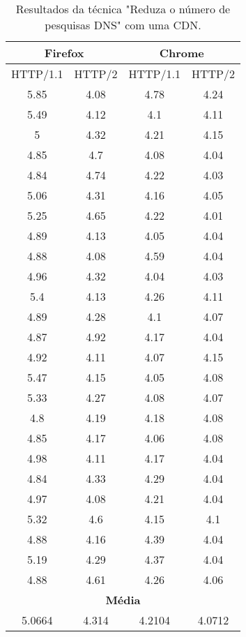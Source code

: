 \begin{table}[H]
	\centering
	\caption{Resultados da técnica "Reduza o número de pesquisas DNS" com uma CDN.}
	\label{resultados-reduzaonumerodepesquisasdns-unica}
	\begin{tabular}{cccc}
		\hline
		\multicolumn{2}{c}{\textbf{Firefox}} & \multicolumn{2}{c}{\textbf{Chrome}} \\
		\hline
		HTTP/1.1 & HTTP/2 & HTTP/1.1 & HTTP/2 \\
		\hline
		5.85 & 4.08 & 4.78 & 4.24 \\
		5.49 & 4.12 & 4.1 & 4.11 \\
		5 & 4.32 & 4.21 & 4.15 \\
		4.85 & 4.7 & 4.08 & 4.04 \\
		4.84 & 4.74 & 4.22 & 4.03 \\
		5.06 & 4.31 & 4.16 & 4.05 \\
		5.25 & 4.65 & 4.22 & 4.01 \\
		4.89 & 4.13 & 4.05 & 4.04 \\
		4.88 & 4.08 & 4.59 & 4.04 \\
		4.96 & 4.32 & 4.04 & 4.03 \\
		5.4 & 4.13 & 4.26 & 4.11 \\
		4.89 & 4.28 & 4.1 & 4.07 \\
		4.87 & 4.92 & 4.17 & 4.04 \\
		4.92 & 4.11 & 4.07 & 4.15 \\
		5.47 & 4.15 & 4.05 & 4.08 \\
		5.33 & 4.27 & 4.08 & 4.07 \\
		4.8 & 4.19 & 4.18 & 4.08 \\ 
		4.85 & 4.17 & 4.06 & 4.08 \\
		4.98 & 4.11 & 4.17 & 4.04 \\
		4.84 & 4.33 & 4.29 & 4.04 \\
		4.97 & 4.08 & 4.21 & 4.04 \\
		5.32 & 4.6 & 4.15 & 4.1 \\
		4.88 & 4.16 & 4.39 & 4.04 \\
		5.19 & 4.29 & 4.37 & 4.04 \\
		4.88 & 4.61 & 4.26 & 4.06 \\
		\hline
		\multicolumn{4}{c}{\textbf{Média}} \\
		5.0664 & 4.314 & 4.2104 & 4.0712 \\
		\hline
	\end{tabular}
\end{table}